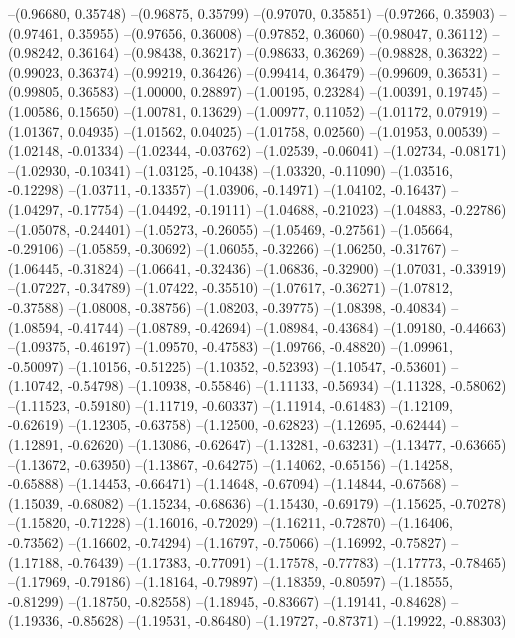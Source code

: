 --(0.96680, 0.35748)
--(0.96875, 0.35799)
--(0.97070, 0.35851)
--(0.97266, 0.35903)
--(0.97461, 0.35955)
--(0.97656, 0.36008)
--(0.97852, 0.36060)
--(0.98047, 0.36112)
--(0.98242, 0.36164)
--(0.98438, 0.36217)
--(0.98633, 0.36269)
--(0.98828, 0.36322)
--(0.99023, 0.36374)
--(0.99219, 0.36426)
--(0.99414, 0.36479)
--(0.99609, 0.36531)
--(0.99805, 0.36583)
--(1.00000, 0.28897)
--(1.00195, 0.23284)
--(1.00391, 0.19745)
--(1.00586, 0.15650)
--(1.00781, 0.13629)
--(1.00977, 0.11052)
--(1.01172, 0.07919)
--(1.01367, 0.04935)
--(1.01562, 0.04025)
--(1.01758, 0.02560)
--(1.01953, 0.00539)
--(1.02148, -0.01334)
--(1.02344, -0.03762)
--(1.02539, -0.06041)
--(1.02734, -0.08171)
--(1.02930, -0.10341)
--(1.03125, -0.10438)
--(1.03320, -0.11090)
--(1.03516, -0.12298)
--(1.03711, -0.13357)
--(1.03906, -0.14971)
--(1.04102, -0.16437)
--(1.04297, -0.17754)
--(1.04492, -0.19111)
--(1.04688, -0.21023)
--(1.04883, -0.22786)
--(1.05078, -0.24401)
--(1.05273, -0.26055)
--(1.05469, -0.27561)
--(1.05664, -0.29106)
--(1.05859, -0.30692)
--(1.06055, -0.32266)
--(1.06250, -0.31767)
--(1.06445, -0.31824)
--(1.06641, -0.32436)
--(1.06836, -0.32900)
--(1.07031, -0.33919)
--(1.07227, -0.34789)
--(1.07422, -0.35510)
--(1.07617, -0.36271)
--(1.07812, -0.37588)
--(1.08008, -0.38756)
--(1.08203, -0.39775)
--(1.08398, -0.40834)
--(1.08594, -0.41744)
--(1.08789, -0.42694)
--(1.08984, -0.43684)
--(1.09180, -0.44663)
--(1.09375, -0.46197)
--(1.09570, -0.47583)
--(1.09766, -0.48820)
--(1.09961, -0.50097)
--(1.10156, -0.51225)
--(1.10352, -0.52393)
--(1.10547, -0.53601)
--(1.10742, -0.54798)
--(1.10938, -0.55846)
--(1.11133, -0.56934)
--(1.11328, -0.58062)
--(1.11523, -0.59180)
--(1.11719, -0.60337)
--(1.11914, -0.61483)
--(1.12109, -0.62619)
--(1.12305, -0.63758)
--(1.12500, -0.62823)
--(1.12695, -0.62444)
--(1.12891, -0.62620)
--(1.13086, -0.62647)
--(1.13281, -0.63231)
--(1.13477, -0.63665)
--(1.13672, -0.63950)
--(1.13867, -0.64275)
--(1.14062, -0.65156)
--(1.14258, -0.65888)
--(1.14453, -0.66471)
--(1.14648, -0.67094)
--(1.14844, -0.67568)
--(1.15039, -0.68082)
--(1.15234, -0.68636)
--(1.15430, -0.69179)
--(1.15625, -0.70278)
--(1.15820, -0.71228)
--(1.16016, -0.72029)
--(1.16211, -0.72870)
--(1.16406, -0.73562)
--(1.16602, -0.74294)
--(1.16797, -0.75066)
--(1.16992, -0.75827)
--(1.17188, -0.76439)
--(1.17383, -0.77091)
--(1.17578, -0.77783)
--(1.17773, -0.78465)
--(1.17969, -0.79186)
--(1.18164, -0.79897)
--(1.18359, -0.80597)
--(1.18555, -0.81299)
--(1.18750, -0.82558)
--(1.18945, -0.83667)
--(1.19141, -0.84628)
--(1.19336, -0.85628)
--(1.19531, -0.86480)
--(1.19727, -0.87371)
--(1.19922, -0.88303)
